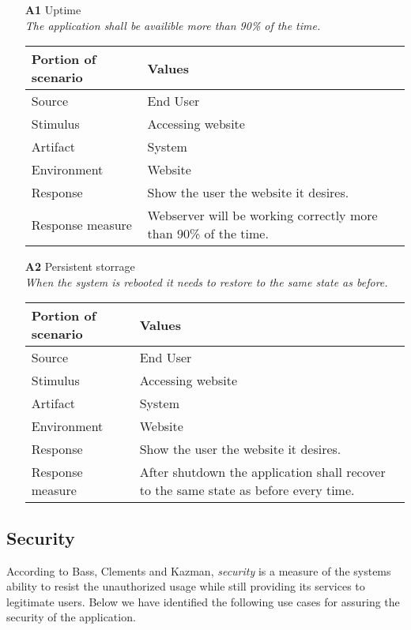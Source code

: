 \begin{itemize}
    \item[\textbf{A1}] Uptime \\
    \textit{\small{The application shall be availible more than 90\% of the time.}}
        
    \begin{tabular}{| l | p{7cm} |}
        \hline
        \rowcolor[gray]{0.8}
        \textbf{Portion of scenario} & \textbf{Values} \\
        \hline
        Source & End User \\
        Stimulus & Accessing website \\
        Artifact & System \\
        Environment & Website \\
        Response & Show the user the website it desires. \\
        Response measure & Webserver will be working correctly more than 90\% of the time. \\
        \hline
    \end{tabular}

    \item[\textbf{A2}] Persistent storrage \\
    \textit{\small{When the system is rebooted it needs to restore to the same state as before.}}
        
    \begin{tabular}{| l | p{7cm} |}
        \hline
        \rowcolor[gray]{0.8}
        \textbf{Portion of scenario} & \textbf{Values} \\
        \hline
        Source & End User \\
        Stimulus & Accessing website \\
        Artifact & System \\
        Environment & Website \\
        Response & Show the user the website it desires. \\
        Response measure & After shutdown the application shall recover to the same state as before every time. \\
        \hline
    \end{tabular}
\end{itemize}

\subsection{Security}
According to Bass, Clements and Kazman, \emph{security} is a measure of the systems ability to resist the unauthorized usage while still providing its services to legitimate users\cite{ProgarkPensum}. Below we have identified the following use cases for assuring the security of the application.

